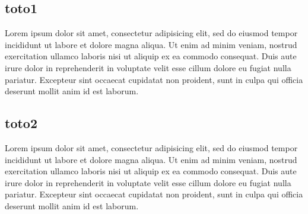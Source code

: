 \documentclass{book}
\begin{document}
\begin{pages}
\begin{Rightside}
\subsection{toto1}\skipnumbering
\pend
\pstart
\begin{ledgroup}

\skipnumbering Lorem ipsum dolor sit amet, consectetur adipisicing elit, sed do eiusmod tempor incididunt ut labore et dolore magna aliqua. Ut enim ad minim veniam, nostrud exercitation ullamco laboris nisi ut aliquip ex ea commodo consequat. Duis aute irure dolor in reprehenderit in voluptate velit esse cillum dolore eu fugiat nulla pariatur. Excepteur sint occaecat cupidatat non proident, sunt in culpa qui officia deserunt mollit anim id est laborum.
\end{ledgroup}
\pend

\pstart
\subsection{toto2}
\pend
\pstart
\begin{ledgroup}

Lorem ipsum dolor sit amet, consectetur adipisicing elit, sed do eiusmod tempor incididunt ut labore et dolore magna aliqua. Ut enim ad minim veniam, nostrud exercitation ullamco laboris nisi ut aliquip ex ea commodo consequat. Duis aute irure dolor in reprehenderit in voluptate velit esse cillum dolore eu fugiat nulla pariatur. Excepteur sint occaecat cupidatat non proident, sunt in culpa qui officia deserunt mollit anim id est laborum.
\end{ledgroup}
\pend
\endnumbering
\end{Rightside}
\Pages
\end{pages}
\end{document}
